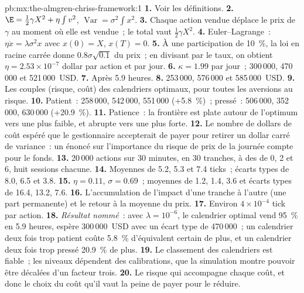 \begin{solution}{pb:mx:the-almgren-chriss-framework:1}
\textbf{1.} Voir les définitions.
\textbf{2.} $\E=\tfrac12\gamma X^2+\eta\int v^2$, $\operatorname{Var}=\sigma^2\int x^2$.
\textbf{3.} Chaque action vendue déplace le prix de $\gamma$ au moment où elle est vendue~; le total vaut $\tfrac12\gamma X^2$.
\textbf{4.} Euler--Lagrange~: $\eta\ddot x=\lambda\sigma^2x$ avec $x(0)=X$, $x(T)=0$.
\textbf{5.} À une participation de 10~\%, la loi en racine carrée donne $0.8\sigma\sqrt{0.1}$ du prix~; en divisant par le taux, on obtient $\eta=2.53\times10^{-7}$ dollar
par action et par jour.
\textbf{6.} $\kappa=1.99$ par jour~; 300\,000, 470\,000 et 521\,000~USD.
\textbf{7.} Après 5.9 heures.
\textbf{8.} 253\,000, 576\,000 et 585\,000~USD.
\textbf{9.} Les couples (risque, coût) des calendriers optimaux, pour toutes les aversions au risque.
\textbf{10.} Patient~: 258\,000, 542\,000, 551\,000 (+5.8~\%)~; pressé~: 506\,000, 352\,000, 630\,000 (+20.9~\%).
\textbf{11.} Patience~: la frontière est plate autour de l'optimum vers une  plus faible, et abrupte vers une  plus forte.
\textbf{12.} Le nombre de dollars de coût espéré que le gestionnaire accepterait de payer pour retirer un dollar carré de variance~: un énoncé sur l'importance du risque de prix de la journée
compte pour le fonds.
\textbf{13.} 20\,000 actions sur 30 minutes, en 30 tranches, à des  de 0, 2 et 6, huit sessions chacune.
\textbf{14.} Moyennes de 5.2, 5.3 et 7.4 ticks~; écarts types de 8.0, 6.5 et 3.8.
\textbf{15.} $\eta=0.11$, $\sigma=0.69$~; moyennes de 1.2, 1.4, 3.6 et écarts types de 16.4, 13.2, 7.6.
\textbf{16.} L'accumulation de l'impact d'une tranche à l'autre (une part permanente) et le retour à la moyenne du prix.
\textbf{17.} Environ $4\times10^{-4}$ tick par action.
\textbf{18.} \emph{Résultat nommé}~: avec $\lambda=10^{-6}$, le calendrier optimal vend 95~\% en 5.9 heures, espère 300\,000~USD avec un écart type de 470\,000~;
un calendrier deux fois trop patient coûte 5.8~\% d'équivalent certain de plus, et un calendrier deux fois trop pressé 20.9~\% de plus.
\textbf{19.} Le classement des calendriers est fiable~; les niveaux dépendent des calibrations, que la simulation montre pouvoir être décalées d'un facteur trois.
\textbf{20.} Le risque qui accompagne chaque coût, et donc le choix du coût qu'il vaut la peine de payer pour le réduire.
\end{solution}

